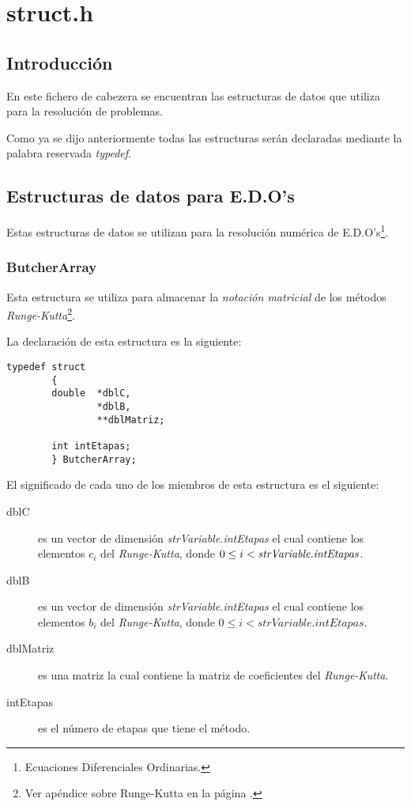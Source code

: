 %
%

\chapter{struct.h}

\section{Introducci\'on}

En este fichero de cabezera se encuentran las estructuras de datos que utiliza
\BI para la resoluci\'on de problemas.\newline

\par Como ya se dijo anteriormente todas las estructuras ser\'an declaradas
mediante la palabra reservada \emph{typedef}.

\newpage

\section{Estructuras de datos para E.D.O's} \label{sec:datosEDO}

Estas estructuras de datos se utilizan para la resoluci\'on num\'erica de
E.D.O's\footnote{Ecuaciones Diferenciales Ordinarias.}.

\subsection{ButcherArray}

Esta estructura se utiliza para almacenar la \emph{notaci\'on matricial}
de los m\'etodos \emph{Runge-Kutta}\footnote{Ver ap\'endice sobre 
Runge-Kutta en la p\'agina \pageref{sec:Runge}.}.\newline

La declaraci\'on de esta estructura es la siguiente:

\begin{verbatim}
typedef struct
        {
        double  *dblC,
                *dblB,
                **dblMatriz;

        int intEtapas;
        } ButcherArray;
\end{verbatim}

El significado de cada uno de los miembros de esta estructura es el
siguiente:

\begin{description}
\item[dblC] es un vector de dimensi\'on \emph{strVariable.intEtapas} el cual 
contiene los
elementos $c_i$ del \emph{Runge-Kutta}, donde $0 \leq i < 
\emph{strVariable.intEtapas}$.
\item[dblB] es un vector de dimensi\'on \emph{strVariable.intEtapas} el cual 
contiene los
elementos $b_i$ del \emph{Runge-Kutta}, donde $0 \leq i < 
strVariable.intEtapas$.
\item[dblMatriz] es una matriz la cual contiene la matriz de coeficientes del
\emph{Runge-Kutta}.
\item[intEtapas] es el n\'umero de etapas que tiene el m\'etodo.
\end{description}

